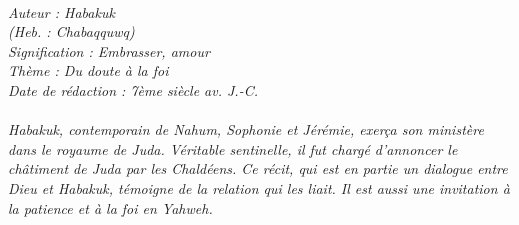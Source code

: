 \BFont
\noindent\hrulefill
{\footnotesize
\textit{
\bigskip
{\centering{}
\\Auteur : Habakuk
\\(Heb. : Chabaqquwq)
\\Signification : Embrasser, amour
\\Thème : Du doute à la foi
\\Date de rédaction : 7ème siècle av. J.-C.\\}
}
\textit{
\\Habakuk, contemporain de Nahum, Sophonie et Jérémie, exerça son ministère dans le royaume de Juda. Véritable sentinelle, il fut chargé d'annoncer le châtiment de Juda par les Chaldéens. Ce récit, qui est en partie un dialogue entre Dieu et Habakuk, témoigne de la relation qui les liait. Il est aussi une invitation à la patience et à la foi en Yahweh.\bigskip
}
}
\par\nobreak\noindent\hrulefill
